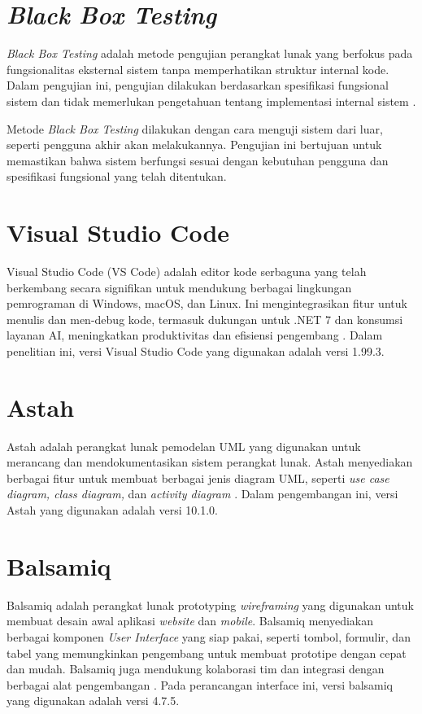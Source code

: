 \section{\textit{Black Box Testing}}
\textit{Black Box Testing} adalah metode pengujian perangkat lunak yang berfokus pada fungsionalitas eksternal sistem tanpa memperhatikan struktur internal kode. Dalam pengujian ini, pengujian dilakukan berdasarkan spesifikasi fungsional sistem dan tidak memerlukan pengetahuan tentang implementasi internal sistem \cite{henard2016comparing}.

Metode \textit{Black Box Testing} dilakukan dengan cara menguji sistem dari luar, seperti pengguna akhir akan melakukannya. Pengujian ini bertujuan untuk memastikan bahwa sistem berfungsi sesuai dengan kebutuhan pengguna dan spesifikasi fungsional yang telah ditentukan.

\section{Visual Studio Code}
Visual Studio Code (VS Code) adalah editor kode serbaguna yang telah berkembang secara signifikan untuk mendukung berbagai lingkungan pemrograman di Windows, macOS, dan Linux. Ini mengintegrasikan fitur untuk menulis dan men-debug kode, termasuk dukungan untuk .NET 7 dan konsumsi layanan AI, meningkatkan produktivitas dan efisiensi pengembang \cite{bree2016using}. Dalam penelitian ini, versi Visual Studio Code yang digunakan adalah versi 1.99.3.

\section{Astah}
Astah adalah perangkat lunak pemodelan UML yang digunakan untuk merancang dan mendokumentasikan sistem perangkat lunak. Astah menyediakan berbagai fitur untuk membuat berbagai jenis diagram UML, seperti \textit{use case diagram, class diagram,} dan \textit{activity diagram} \cite{hayati2021sistem}. Dalam pengembangan ini, versi Astah yang digunakan adalah versi 10.1.0.

\section{Balsamiq}
Balsamiq adalah perangkat lunak prototyping \textit{wireframing} yang digunakan untuk membuat desain awal aplikasi \textit{website} dan \emph{mobile}. Balsamiq menyediakan berbagai komponen \textit{User Interface} yang siap pakai, seperti tombol, formulir, dan tabel yang memungkinkan pengembang untuk membuat prototipe dengan cepat dan mudah. Balsamiq juga mendukung kolaborasi tim dan integrasi dengan berbagai alat pengembangan \cite{balsamiq}. Pada perancangan interface ini, versi balsamiq yang digunakan adalah versi 4.7.5.

